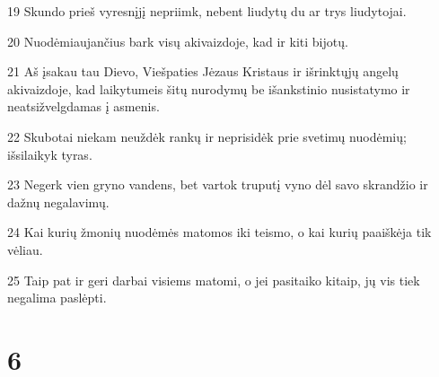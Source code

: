 \par 19 Skundo prieš vyresnįjį nepriimk, nebent liudytų du ar trys liudytojai. 
\par 20 Nuodėmiaujančius bark visų akivaizdoje, kad ir kiti bijotų. 
\par 21 Aš įsakau tau Dievo, Viešpaties Jėzaus Kristaus ir išrinktųjų angelų akivaizdoje, kad laikytumeis šitų nurodymų be išankstinio nusistatymo ir neatsižvelgdamas į asmenis. 
\par 22 Skubotai niekam neuždėk rankų ir neprisidėk prie svetimų nuodėmių; išsilaikyk tyras. 
\par 23 Negerk vien gryno vandens, bet vartok truputį vyno dėl savo skrandžio ir dažnų negalavimų. 
\par 24 Kai kurių žmonių nuodėmės matomos iki teismo, o kai kurių paaiškėja tik vėliau. 
\par 25 Taip pat ir geri darbai visiems matomi, o jei pasitaiko kitaip, jų vis tiek negalima paslėpti.


\chapter{6}


